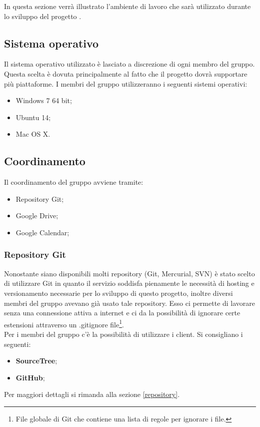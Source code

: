 In questa sezione verrà illustrato l'ambiente di lavoro che sarà utilizzato durante lo sviluppo del progetto \PROGETTO.\\

\subsection{Sistema operativo}

Il sistema operativo utilizzato è lasciato a discrezione di ogni membro del gruppo. Questa scelta è dovuta principalmente al fatto che il progetto dovrà supportare più piattaforme.
I membri del gruppo utilizzeranno i seguenti sistemi operativi:

\begin{itemize}
	\item Windows 7 64 bit;
	\item Ubuntu 14;
	\item Mac OS X.
\end{itemize}

\subsection{Coordinamento}

Il coordinamento del gruppo avviene tramite:
\begin{itemize}
	\item Repository Git;
	\item Google Drive;
	\item Google Calendar;
\end{itemize}

\subsubsection{Repository Git}

Nonostante siano disponibili molti repository (Git, Mercurial, SVN) è stato scelto di utilizzare Git in quanto il servizio soddisfa pienamente le necessità di hosting e versionamento necessarie per lo sviluppo di questo progetto, inoltre diversi membri del gruppo avevano già usato tale repository. Esso ci permette di lavorare senza una connessione attiva a internet e ci da la possibilità di ignorare certe estensioni attraverso un .gitignore file\footnote{File globale di Git che contiene una lista di regole per ignorare i file.}.\\ Per i membri del gruppo c'è la possibilità di utilizzare i client. Si consigliano i seguenti:
\begin{itemize}
	\item \textbf{SourceTree};
	\item \textbf{GitHub};
\end{itemize}
Per maggiori dettagli si rimanda alla sezione \ref{repository}.

